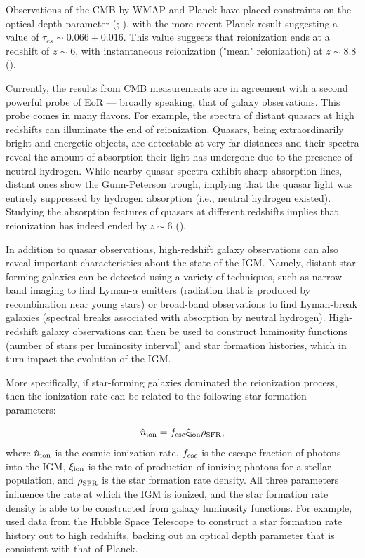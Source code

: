 Observations of the CMB by WMAP and Planck have placed constraints on the optical depth parameter (\citealt{hinshaw_et_al2013}; \citealt{planck2016}), with the more recent Planck result suggesting a value of $\tau_{es} \sim 0.066 \pm 0.016$. This value suggests that reionization ends at a redshift of $z \sim 6$, with instantaneous reionization ("mean" reionization) at $z \sim 8.8$ (\citealt{planck2016}).

Currently, the results from CMB measurements are in agreement with a second powerful probe of EoR --- broadly speaking, that of galaxy observations. This probe comes in many flavors. For example, the spectra of distant quasars at high redshifts can illuminate the end of reionization. Quasars, being extraordinarily bright and energetic objects, are detectable at very far distances and their spectra reveal the amount of absorption their light has undergone due to the presence of neutral hydrogen. While nearby quasar spectra exhibit sharp absorption lines, distant ones show the Gunn-Peterson trough, implying that the quasar light was entirely suppressed by hydrogen absorption (i.e., neutral hydrogen existed). Studying the absorption features of quasars at different redshifts implies that reionization has indeed ended by $z \sim 6$ (\citealt{becker_et_al2001}). 

In addition to quasar observations, high-redshift galaxy observations can also reveal important characteristics about the state of the IGM. Namely, distant star-forming galaxies can be detected using a variety of techniques, such as narrow-band imaging to find Lyman-$\alpha$ emitters (radiation that is produced by recombination near young stars) or broad-band observations to find Lyman-break galaxies (spectral breaks associated with absorption by neutral hydrogen). High-redshift galaxy observations can then be used to construct luminosity functions (number of stars per luminosity interval) and star formation histories, which in turn impact the evolution of the IGM. 

More specifically, if star-forming galaxies dominated the reionization process, then the ionization rate can be related to the following star-formation parameters:

\begin{equation}
\dot{n}_{\rm ion} = f_{\rm esc}\xi_{\rm ion}\rho_{\rm SFR},
\end{equation}
where $\dot{n}_{\rm ion}$ is the cosmic ionization rate, $f_{\rm esc}$ is the escape fraction of photons into the IGM, $\xi_{\rm ion}$ is the rate of production of ionizing photons for a stellar population, and $\rho_{\rm SFR}$ is the star formation rate density. All three parameters influence the rate at which the IGM is ionized, and the star formation rate density is able to be constructed from galaxy luminosity functions. For example, \citet{robertson_et_al2015} used data from the Hubble Space Telescope to construct a star formation rate history out to high redshifts, backing out an optical depth parameter that is consistent with that of Planck. 

